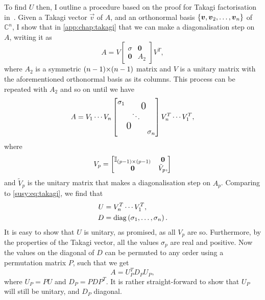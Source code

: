\documentclass[../main.tex]{subfiles}
\begin{document}
To find \(U\) then, I outline a procedure based on the proof for Takagi factorisation in~\cite{Horn}.
Given a Takagi vector \(\vec{v}\) of \(A\), and an orthonormal basis \(\left\{\boldsymbol{v}, \boldsymbol{v}_2, \ldots, \boldsymbol{v}_n\right\}\) of \(\mathbb{C}^n\), I show that in \cref{app:chap:takagi} that we can make a diagonalisation step on \(A\), writing it as
\begin{equation}
  A = V \begin{bmatrix}
    \sigma         & \boldsymbol{0} \\
    \boldsymbol{0} & A_2
  \end{bmatrix} V^T,
\end{equation}
where \(A_2\) is a symmetric \((n-1) {\times} (n-1)\) matrix and \(V\) is a unitary matrix with the aforementioned orthonormal basis as its columns.
This process can be repeated with \(A_2\) and so on until we have
\begin{equation}
  A = V_1 \cdots V_{n} \begin{bmatrix}
    \sigma_1                                            & \multicolumn{2}{c}{\raisebox{-7pt}{\mbox{\Large 0}}}   \\
                                                        & \ddots                                               & \\
    \multicolumn{2}{c}{\raisebox{7pt}{\mbox{\Large 0}}} & \sigma_n
  \end{bmatrix} V_{n}^T \cdots V_{1}^T,
\end{equation}
where
\begin{equation}
  V_p = \begin{bmatrix}
    \mathbb{I}_{(p-1) {\times} (p-1)} & \boldsymbol{0} \\
    \boldsymbol{0}               & \tilde{V}_p,
  \end{bmatrix}
\end{equation}
and \(\tilde{V}_p\) is the unitary matrix that makes a diagonalisation step on \(A_p\).
Comparing to \cref{susy:eq:takagi}, we find that
\begin{subequations}
  \begin{align}
    U & = V_{n}^T \cdots V_{1}^T,                                  \\
    D & = \operatorname{diag}\left(\sigma_1, \ldots, \sigma_n\right).
  \end{align}
\end{subequations}
It is easy to show that \(U\) is unitary, as promised, as all \(V_{p}\) are so.
Furthermore, by the properties of the Takagi vector, all the values \(\sigma_p\) are real and positive.
Now the values on the diagonal of \(D\) can be permuted to any order using a permutation matrix \(P\), such that we get
\begin{equation}
  A = U_P^T D_P U_P,
\end{equation}
where \(U_P = P U\) and \(D_P = P D P^T\).
It is rather straight-forward to show that \(U_P\) will still be unitary, and \(D_P\) diagonal.
\end{document}
